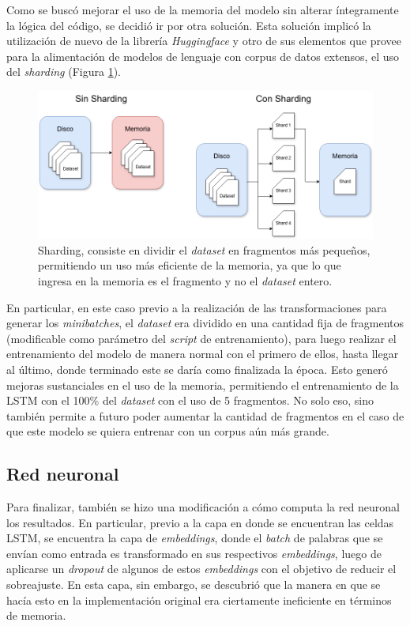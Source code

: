 Como se buscó mejorar el uso de la memoria del modelo sin alterar íntegramente la lógica del código, se decidió ir por otra solución. Esta solución implicó la utilización de nuevo de la librería \textit{Huggingface} y otro de sus elementos que provee para la alimentación de modelos de lenguaje con corpus de datos extensos, el uso del \textit{sharding} (Figura \ref{fig:sharding}).

\begin{figure}[htb]
    \centering
    \includegraphics[width=1\textwidth]{imagenes/sharding.png}
    \caption{Sharding, consiste en dividir el \textit{dataset} en fragmentos más pequeños, permitiendo un uso más eficiente de la memoria, ya que lo que ingresa en la memoria es el fragmento y no el \textit{dataset} entero.}
    \label{fig:sharding}
\end{figure}

En particular, en este caso previo a la realización de las transformaciones para generar los \textit{minibatches}, el \textit{dataset} era dividido en una cantidad fija de fragmentos (modificable como parámetro del \textit{script} de entrenamiento), para luego realizar el entrenamiento del modelo de manera normal con el primero de ellos, hasta llegar al último, donde terminado este se daría como finalizada la época. Esto generó mejoras sustanciales en el uso de la memoria, permitiendo el entrenamiento de la LSTM con el 100\% del \textit{dataset} con el uso de 5 fragmentos. No solo eso, sino también permite a futuro poder aumentar la cantidad de fragmentos en el caso de que este modelo se quiera entrenar con un corpus aún más grande.

\subsection{Red neuronal}

Para finalizar, también se hizo una modificación a cómo computa la red neuronal los resultados. En particular, previo a la capa en donde se encuentran las celdas LSTM, se encuentra la capa de \textit{embeddings}, donde el \textit{batch} de palabras que se envían como entrada es transformado en sus respectivos \textit{embeddings}, luego de aplicarse un \textit{dropout} de algunos de estos \textit{embeddings} con el objetivo de reducir el sobreajuste. En esta capa, sin embargo, se descubrió que la manera en que se hacía esto en la implementación original era ciertamente ineficiente en términos de memoria.

